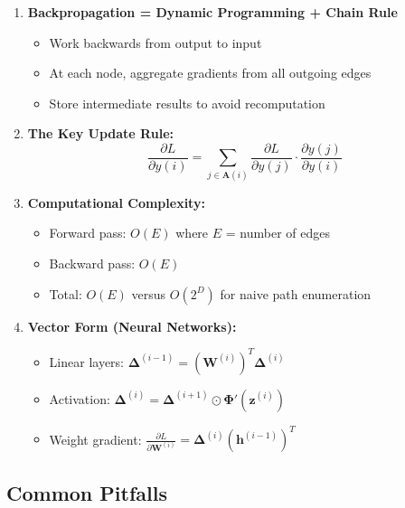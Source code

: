 \begin{notechapter}
\begin{tcolorbox}[colback=green!5,colframe=green!60,title=Main Ideas]
\begin{enumerate}
    \item \textbf{Backpropagation = Dynamic Programming + Chain Rule}
    \begin{itemize}
        \item Work backwards from output to input
        \item At each node, aggregate gradients from all outgoing edges
        \item Store intermediate results to avoid recomputation
    \end{itemize}
    
    \item \textbf{The Key Update Rule:}
    $$\frac{\partial L}{\partial y(i)} = \sum_{j \in \mathbf{A}(i)} \frac{\partial L}{\partial y(j)} \cdot \frac{\partial y(j)}{\partial y(i)}$$
    
    \item \textbf{Computational Complexity:}
    \begin{itemize}
        \item Forward pass: $O(E)$ where $E$ = number of edges
        \item Backward pass: $O(E)$
        \item Total: $O(E)$ versus $O(2^D)$ for naive path enumeration
    \end{itemize}
    
    \item \textbf{Vector Form (Neural Networks):}
    \begin{itemize}
        \item Linear layers: $\boldsymbol{\Delta}^{(i-1)} = (\mathbf{W}^{(i)})^T \boldsymbol{\Delta}^{(i)}$
        \item Activation: $\boldsymbol{\Delta}^{(i)} = \boldsymbol{\Delta}^{(i+1)} \odot \boldsymbol{\Phi}'(\mathbf{z}^{(i)})$
        \item Weight gradient: $\frac{\partial L}{\partial \mathbf{W}^{(i)}} = \boldsymbol{\Delta}^{(i)} (\mathbf{h}^{(i-1)})^T$
    \end{itemize}
\end{enumerate}
\end{tcolorbox}

\subsection{Common Pitfalls}


\end{notechapter}

